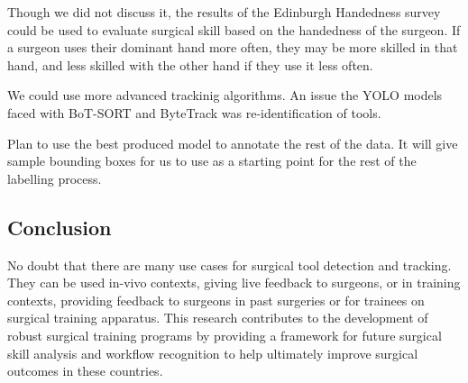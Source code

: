 Though we did not discuss it, the results of the Edinburgh Handedness survey \cite{oldfield_assessment_1971} could be used to evaluate surgical skill based on the handedness of the surgeon. If a surgeon uses their dominant hand more often, they may be more skilled in that hand, and less skilled with the other hand if they use it less often.

We could use more advanced trackinig algorithms. An issue the YOLO models faced with BoT-SORT and ByteTrack was re-identification of tools.

Plan to use the best produced model to annotate the rest of the data. It will give sample bounding boxes for us to use as a starting point for the rest of the labelling process.




\subsection{Conclusion}

No doubt that there are many use cases for surgical tool detection and tracking. They can be used in-vivo contexts, giving live feedback to surgeons, or in training contexts, providing feedback to surgeons in past surgeries or for trainees on surgical training apparatus.
This research contributes to the development of robust surgical training programs by providing a framework for future surgical skill analysis and workflow recognition to help ultimately improve surgical outcomes in these countries.